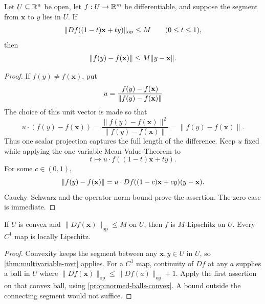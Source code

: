 \begin{theorem}
\label{thm:multivariable-mvt}
Let $U\subseteq\mathbb{R}^n$ be open, let $f:U\to\mathbb{R}^m$ be differentiable, and suppose
the segment from $\mathbf{x}$ to $y$ lies in $U$.  If
\[
\lVert Df((1-t)\mathbf{x}+ty)\rVert_{\mathrm{op}}\leq M
\qquad(0\leq t\leq1),
\]
then
\[
\lVert f(y)-f(\mathbf{x})\rVert\leq M\lVert y-\mathbf{x}\rVert.
\]
\end{theorem}
\begin{proof}
If $f(y)\ne f(\mathbf{x})$, put
\[
u=\frac{f(y)-f(\mathbf{x})}{\lVert f(y)-f(\mathbf{x})\rVert}
\]
The choice of this unit vector is made so that
\[
u\cdot(f(y)-f(\mathbf{x}))
=\frac{\|f(y)-f(\mathbf{x})\|^2}{\|f(y)-f(\mathbf{x})\|}
=\|f(y)-f(\mathbf{x})\|.
\]
Thus one scalar projection captures the full length of the difference.
Keep $u$ fixed while applying the one-variable Mean Value Theorem to
\[
t\longmapsto u\cdot f((1-t)\mathbf{x}+ty).
\]
For some $c\in(0,1)$,
\[
\lVert f(y)-f(\mathbf{x})\rVert
=
u\cdot Df((1-c)\mathbf{x}+cy)(y-\mathbf{x}).
\]
Cauchy--Schwarz and the operator-norm bound prove the assertion.  The zero
case is immediate.
\end{proof}

\begin{corollary}
If $U$ is convex and $\|Df(\mathbf{x})\|_{\mathrm{op}}\leq M$ on $U$, then
$f$ is $M$-Lipschitz on $U$. Every $C^1$ map is locally Lipschitz.
\end{corollary}
\begin{proof}
Convexity keeps the segment between any $\mathbf{x},y\in U$ in $U$, so
\cref{thm:multivariable-mvt} applies. For a $C^1$ map, continuity of
$Df$ at any $a$ supplies a ball in $U$ where
$\|Df(\mathbf{x})\|_{\mathrm{op}}\leq\|Df(a)\|_{\mathrm{op}}+1$. Apply the first assertion
on that convex ball, using \cref{prop:normed-balls-convex}. A bound outside
the connecting segment would not suffice.
\end{proof}


